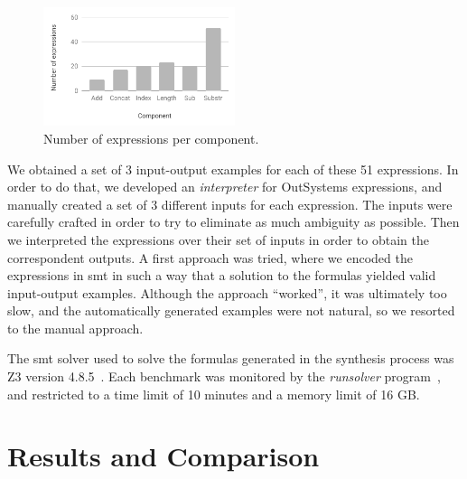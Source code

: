 \begin{figure}
  \centering
  \includegraphics[width=0.5\textwidth]{assets/bar-chart-components-freq-51.pdf}
  \caption{Number of expressions per component.}
  \label{fig:bar-chart-components-freq-51}
\end{figure}

We obtained a set of 3 input-output examples for each of these 51 expressions.
In order to do that, we developed an \textit{interpreter} for OutSystems
expressions, and manually created a set of 3 different inputs for each
expression.
The inputs were carefully crafted in order to try to eliminate as much ambiguity
as possible.
Then we interpreted the expressions over their set of inputs in order to
obtain the correspondent outputs.
A first approach was tried, where we encoded the expressions in \gls{smt} in
such a way that a solution to the formulas yielded valid input-output examples.
Although the approach ``worked'', it was ultimately too slow, and the
automatically generated examples were not natural, so we resorted to the manual
approach.

The \gls{smt} solver used to solve the formulas generated in the synthesis
process was Z3 version 4.8.5~\cite{DeMoura:2008:ZES}.
Each benchmark was monitored by the \textit{runsolver}
program~\cite{Roussel:2011:JSAT}, and restricted to a time limit of 10 minutes
and a memory limit of 16 GB.

\section{Results and Comparison}
\label{sec:results-and-comparison}

